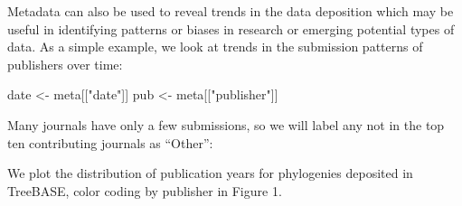 \documentclass[author-year, 8pt, 3p]{elsarticle} %
\newenvironment{Shaded}{}{}
\newcommand{\KeywordTok}[1]{\textcolor[rgb]{0.00,0.44,0.13}{\textbf{{#1}}}}
\newcommand{\DataTypeTok}[1]{\textcolor[rgb]{0.56,0.13,0.00}{{#1}}}
\newcommand{\DecValTok}[1]{\textcolor[rgb]{0.25,0.63,0.44}{{#1}}}
\newcommand{\StringTok}[1]{\textcolor[rgb]{0.25,0.44,0.63}{{#1}}}
\newcommand{\OtherTok}[1]{\textcolor[rgb]{0.00,0.44,0.13}{{#1}}}
\newcommand{\NormalTok}[1]{{#1}}
\begin{document}
Metadata can also be used to reveal trends in the data deposition which
may be useful in identifying patterns or biases in research or emerging
potential types of data. As a simple example, we look at trends in the
submission patterns of publishers over time:

\begin{Shaded}
\begin{Highlighting}[]
    \NormalTok{date <- meta[[}\StringTok{"date"}\NormalTok{]] }
    \NormalTok{pub <- meta[[}\StringTok{"publisher"}\NormalTok{]]}
\end{Highlighting}
\end{Shaded}
Many journals have only a few submissions, so we will label any not in
the top ten contributing journals as ``Other'':

\begin{Shaded}
\end{Shaded}
We plot the distribution of publication years for phylogenies deposited
in TreeBASE, color coding by publisher in Figure 1.
\end{document}
